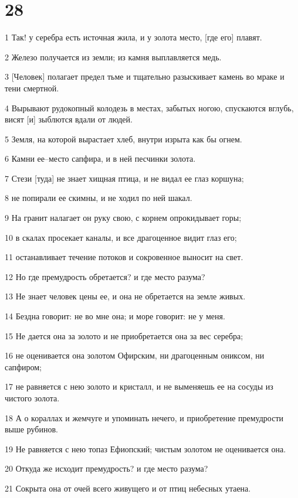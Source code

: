 \chapter{28}

\par 1 Так! у серебра есть источная жила, и у золота место, [где его] плавят.
\par 2 Железо получается из земли; из камня выплавляется медь.
\par 3 [Человек] полагает предел тьме и тщательно разыскивает камень во мраке и тени смертной.
\par 4 Вырывают рудокопный колодезь в местах, забытых ногою, спускаются вглубь, висят [и] зыблются вдали от людей.
\par 5 Земля, на которой вырастает хлеб, внутри изрыта как бы огнем.
\par 6 Камни ее--место сапфира, и в ней песчинки золота.
\par 7 Стези [туда] не знает хищная птица, и не видал ее глаз коршуна;
\par 8 не попирали ее скимны, и не ходил по ней шакал.
\par 9 На гранит налагает он руку свою, с корнем опрокидывает горы;
\par 10 в скалах просекает каналы, и все драгоценное видит глаз его;
\par 11 останавливает течение потоков и сокровенное выносит на свет.
\par 12 Но где премудрость обретается? и где место разума?
\par 13 Не знает человек цены ее, и она не обретается на земле живых.
\par 14 Бездна говорит: не во мне она; и море говорит: не у меня.
\par 15 Не дается она за золото и не приобретается она за вес серебра;
\par 16 не оценивается она золотом Офирским, ни драгоценным ониксом, ни сапфиром;
\par 17 не равняется с нею золото и кристалл, и не выменяешь ее на сосуды из чистого золота.
\par 18 А о кораллах и жемчуге и упоминать нечего, и приобретение премудрости выше рубинов.
\par 19 Не равняется с нею топаз Ефиопский; чистым золотом не оценивается она.
\par 20 Откуда же исходит премудрость? и где место разума?
\par 21 Сокрыта она от очей всего живущего и от птиц небесных утаена.
